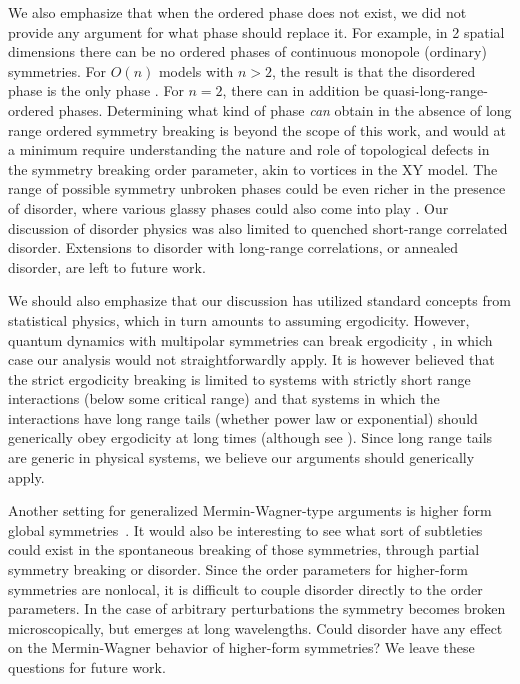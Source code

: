 \documentclass[pra,aps,twocolumn, amsfonts,amsmath,amssymb,nofootinbib,superscriptaddress]{revtex4}
\begin{document}
We also emphasize that when the ordered phase does not exist, we did not provide any argument for what phase should replace it. For example, in 2 spatial dimensions there can be no ordered phases of continuous monopole (ordinary) symmetries. For $O(n)$ models with $n>2$, the result is that the disordered phase is the only phase \cite{polyakov}. For $n=2$, there can in addition be quasi-long-range-ordered phases. Determining what kind of phase {\it can} obtain in the absence of long range ordered symmetry breaking is beyond the scope of this work, and would at a minimum require understanding the nature and role of topological defects in the symmetry breaking order parameter, akin to vortices in the XY model. The range of possible symmetry unbroken phases could be even richer in the presence of disorder, where various glassy phases could also come into play \cite{Fisheretal}. Our discussion of disorder physics was also limited to quenched short-range correlated disorder. Extensions to disorder with long-range correlations, or annealed disorder, are left to future work.

We should also emphasize that our discussion has utilized standard concepts from statistical physics, which in turn amounts to assuming  ergodicity. However, quantum dynamics with multipolar symmetries can break ergodicity \cite{KHN, Sala}, in which case our analysis would not straightforwardly apply. It is however believed that the strict ergodicity breaking is limited to systems with strictly short range interactions (below some critical range) and that systems in which the interactions have long range tails (whether power law or exponential) should generically obey ergodicity at long times (although see \cite{NS}). Since long range tails are generic in physical systems, we believe our arguments should generically apply.  

Another setting for generalized Mermin-Wagner-type arguments is higher form global symmetries~\cite{GKSW, Lake, Marvin}. It would also be interesting to see what sort of subtleties could exist in the spontaneous breaking of those symmetries, through partial symmetry breaking or disorder. Since the order parameters for higher-form symmetries are nonlocal, it is difficult to couple disorder directly to the order parameters. In the case of arbitrary perturbations the symmetry becomes broken microscopically, but emerges at long wavelengths. Could disorder have any effect on the Mermin-Wagner behavior of higher-form symmetries? We leave these questions for future work. 
\end{document}
